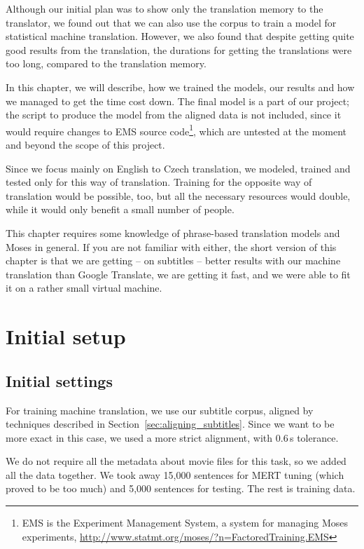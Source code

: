 \label{chap:moses}

Although our initial plan was to show only the translation memory to the translator, we found out that we can also use the corpus to train a model for statistical machine translation. However, we also found that despite getting quite good results from the translation, the durations for getting the translations were too long, compared to the translation memory.

In this chapter, we will describe, how we trained the models, our results and how we managed to get the time cost down. The final model is a part of our project; the script to produce the model from the aligned data is not included, since it would require changes to EMS source code\footnote{EMS is the Experiment Management System, a system for managing Moses experiments, \url{http://www.statmt.org/moses/?n=FactoredTraining.EMS}}, which are untested at the moment and beyond the scope of this project.

Since we focus mainly on English to Czech translation, we modeled, trained and tested only for this way of translation. Training for the opposite way of translation would be possible, too, but all the necessary resources would double, while it would only benefit a small number of people.

This chapter requires some knowledge of phrase-based translation models and Moses in general. If you are not familiar with either, the short version of this chapter is that we are getting -- on subtitles -- better results with our machine translation than Google Translate, we are getting it fast, and we were able to fit it on a rather small virtual machine.


\section{Initial setup}
\subsection{Initial settings}

For training machine translation, we use our subtitle corpus, aligned by techniques described in Section~\ref{sec:aligning_subtitles}. Since we want to be more exact in this case, we used a more strict alignment, with 0.6\,s tolerance.

We do not require all the metadata about movie files for this task, so we added all the data together. We took away 15,000 sentences for MERT tuning (which proved to be too much) and 5,000 sentences for testing. The rest is training data.

